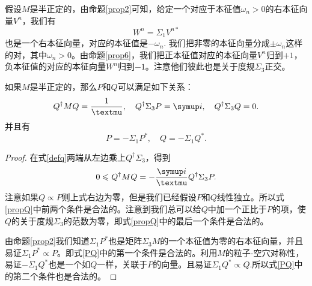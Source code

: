 假设$M$是半正定的，由命题\ref{prop2}可知，给定一个对应于本征值$\omega_n>0$的右本征向量$V^n$，我们有
\begin{equation}
  W^n = \Sigma_1 V^{n*}
\end{equation}
也是一个右本征向量，对应的本征值是$-\omega_n$. 我们把非零的本征向量分成$\pm \omega_n$这样的对，其中$\omega_n>0$。由命题\ref{prop6}，我们把正本征值对应的本征向量$V^n$归到$+1$，负本征值的对应的本征向量$W^n$归到$-1$。注意他们彼此也是关于度规$\Sigma_3$正交。

\begin{proposition}
    如果$M$是半正定的，那么$P$和$Q$可以满足如下关系：
    \begin{equation}
  Q^\dagger M Q= \frac{1}{\mu} ,\quad Q^\dagger \Sigma_3 P =\iu ,\quad Q^\dagger \Sigma_3 Q=0. \label{propQ}
\end{equation}
并且有
\begin{equation}
  P=-\Sigma_1 P^*, \quad Q=-\Sigma_1 Q^*.\label{PQ}
\end{equation}

\end{proposition}

\begin{proof}
    在式\eqref{defq}两端从左边乘上$Q^\dagger \Sigma_3$，得到
    \begin{equation}
  0\leq Q^\dagger M Q = -\frac{\iu}{\mu}Q^\dagger \Sigma_3 P.
\end{equation}
注意如果$Q\propto P$则上式右边为零，但是我们已经假设$P$和$Q$线性独立。所以式\eqref{propQ}中前两个条件是合法的。注意到我们总可以给$Q$中加一个正比于$P$的项，使$Q$的关于度规$\Sigma_3$的范数为零，即式\eqref{propQ}中的最后一个条件是合法的。

由命题\ref{prop2}我们知道$\Sigma_1 P^*$也是矩阵$\Sigma_3 M$的一个本征值为零的右本征向量，并且易证$\Sigma_1 P^*\propto P$。即式\eqref{PQ}中的第一个条件是合法的。利用$M$的粒子-空穴对称性，易证$-\Sigma_1 Q^*$也是一个如$Q$一样，关联于$P$的向量。且易证$\Sigma_1 Q^* \propto Q$.所以式\eqref{PQ}中的第二个条件也是合法的。
\end{proof}

